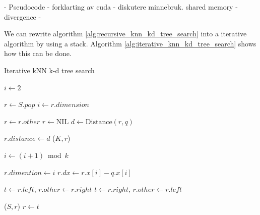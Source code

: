 - Pseudocode
- forklarting av cuda
- diskutere minnebruk. shared memory
- divergence
-





We can rewrite algorithm \ref{alg:recursive_knn_kd_tree_search} into a iterative algorithm by using a stack. Algorithm \ref{alg:iterative_knn_kd_tree_search} shows how this can be done.

\begin{algorithm}
\caption{Iterative kNN k-d tree search}
\label{alg:iterative_knn_kd_tree_search}
\begin{algorithmic}
        \State {}

        \State $i \gets 2$

                \State $r \gets S.pop$
                \State $i \gets r.dimension$

                 
                    \State $r \gets r.other$
                \Else
                    \State $r \gets \text{NIL}$
                \EndIf
            \Else
                \State $d \gets \text{Distance}(r, q)$

                 
                    \State $r.distance \gets d$
                    \State {}($K, r$)
                \EndIf

                \State $i \gets (i + 1) \bmod k$ 

                \State $r.dimention \gets i$
                \State $r.dx \gets r.x[i] - q.x[i]$

                  
                    \State $t \gets r.left$, $r.other \gets r.right$
                \Else
                    \State $t \gets r.right$, $r.other \gets r.left$
                \EndIf

                \State {}($S, r$)
                \State $r \gets t$
            \EndIf

        \EndWhile
    \EndProcedure
\end{algorithmic}
\end{algorithm}

